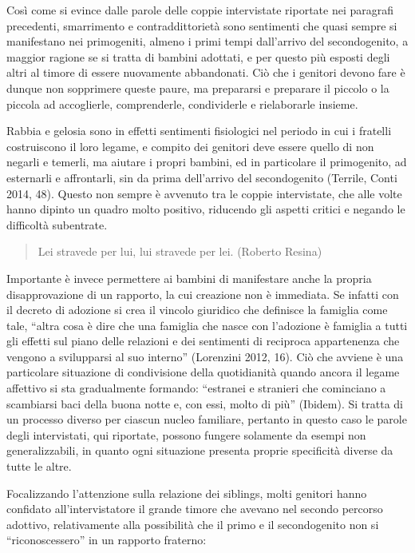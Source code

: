 \documentclass[12pt,oneside,svgnames]{memoir}
\newenvironment{quotationb}%
{\color{maincolor}\begin{leftbar}\begin{quotation}}%
{\end{quotation}\end{leftbar}\ignorespacesafterend}
\begin{document}
Così come si evince dalle parole delle coppie intervistate riportate nei
paragrafi precedenti, smarrimento e contraddittorietà sono sentimenti
che quasi sempre si manifestano nei primogeniti, almeno i primi tempi
dall'arrivo del secondogenito, a maggior ragione se si tratta di bambini
adottati, e per questo più esposti degli altri al timore di essere
nuovamente abbandonati. Ciò che i genitori devono fare è dunque non
sopprimere queste paure, ma prepararsi e preparare il piccolo o la
piccola ad accoglierle, comprenderle, condividerle e rielaborarle
insieme.

Rabbia e gelosia sono in effetti sentimenti fisiologici nel periodo in
cui i fratelli costruiscono il loro legame, e compito dei genitori deve
essere quello di non negarli e temerli, ma aiutare i propri bambini, ed
in particolare il primogenito, ad esternarli e affrontarli, sin da prima
dell'arrivo del secondogenito (Terrile, Conti 2014, 48). Questo non
sempre è avvenuto tra le coppie intervistate, che alle volte hanno
dipinto un quadro molto positivo, riducendo gli aspetti critici e
negando le difficoltà subentrate.

\begin{quotationb}
Lei stravede per lui, lui stravede per lei. (Roberto Resina)
\end{quotationb}

Importante è invece permettere ai bambini di manifestare anche la
propria disapprovazione di un rapporto, la cui creazione non è
immediata. Se infatti con il decreto di adozione si crea il vincolo
giuridico che definisce la famiglia come tale, ``altra cosa è dire che
una famiglia che nasce con l'adozione è famiglia a tutti gli effetti sul
piano delle relazioni e dei sentimenti di reciproca appartenenza che
vengono a svilupparsi al suo interno'' (Lorenzini 2012, 16). Ciò che
avviene è una particolare situazione di condivisione della quotidianità
quando ancora il legame affettivo si sta gradualmente formando:
``estranei e stranieri che cominciano a scambiarsi baci della buona
notte e, con essi, molto di più'' (Ibidem). Si tratta di un processo
diverso per ciascun nucleo familiare, pertanto in questo caso le parole
degli intervistati, qui riportate, possono fungere solamente da esempi
non generalizzabili, in quanto ogni situazione presenta proprie
specificità diverse da tutte le altre.

Focalizzando l'attenzione sulla relazione dei siblings, molti genitori
hanno confidato all'intervistatore il grande timore che avevano nel
secondo percorso adottivo, relativamente alla possibilità che il primo e
il secondogenito non si ``riconoscessero'' in un rapporto fraterno:
\end{document}
